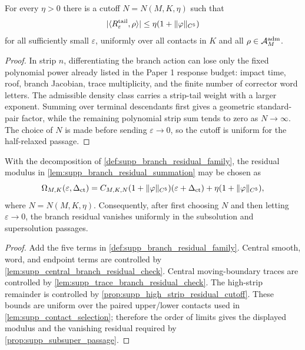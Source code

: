 \begin{proposition}
\label{prop:supp_high_strip_residual_cutoff}
For every \(\eta>0\) there is a cutoff \(N=N(M,K,\eta)\) such that
\[
  |\langle R_\varepsilon^{\rm tail},\rho\rangle|
  \le
  \eta(1+\|\varphi\|_{C^5})
\]
for all sufficiently small \(\varepsilon\), uniformly over all contacts in
\(K\) and all \(\rho\in\mathcal A^{\mathrm{adm}}_M\).
\end{proposition}

\begin{proof}
In strip \(n\), differentiating the branch action can lose only the fixed
polynomial power already listed in the Paper 1 response budget: impact time,
roof, branch Jacobian, trace multiplicity, and the finite number of corrector
word letters.  The admissible density class carries a strip-tail weight with a
larger exponent.  Summing over terminal descendants first gives a geometric
standard-pair factor, while the remaining polynomial strip sum tends to zero
as \(N\to\infty\).  The choice of \(N\) is made before sending
\(\varepsilon\to0\), so the cutoff is uniform for the half-relaxed passage.
\end{proof}

\begin{proposition}
\label{prop:supp_full_branch_residual_check}
With the decomposition of \cref{def:supp_branch_residual_family}, the residual
modulus in \cref{lem:supp_branch_residual_summation} may be chosen as
\[
  \Omega_{M,K}(\varepsilon,\Delta_{\rm ct})
  =
  C_{M,K,N}(1+\|\varphi\|_{C^5})(\varepsilon+\Delta_{\rm ct})
  +\eta(1+\|\varphi\|_{C^5}),
\]
where \(N=N(M,K,\eta)\).  Consequently, after first choosing \(N\) and then
letting \(\varepsilon\to0\), the branch residual vanishes uniformly in the
subsolution and supersolution passages.
\end{proposition}

\begin{proof}
Add the five terms in \cref{def:supp_branch_residual_family}.  Central smooth,
word, and endpoint terms are controlled by
\cref{lem:supp_central_branch_residual_check}.  Central moving-boundary traces
are controlled by \cref{lem:supp_trace_branch_residual_check}.  The
high-strip remainder is controlled by
\cref{prop:supp_high_strip_residual_cutoff}.  These bounds are uniform over
the paired upper/lower contacts used in \cref{lem:supp_contact_selection};
therefore the order of limits gives the displayed modulus and the vanishing
residual required by \cref{prop:supp_subsuper_passage}.
\end{proof}

